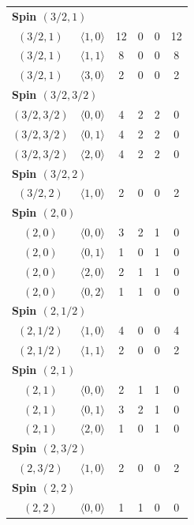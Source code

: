 \begin{longtable}{c c c c c c}
\midrule
\multicolumn{6}{l}{\textbf{Spin $(3/2,1)$}}\\
$(3/2,1)$ & $\langle 1,0\rangle$ & 12 & 0 & 0 & 12 \\
$(3/2,1)$ & $\langle 1,1\rangle$ & 8 & 0 & 0 & 8 \\
$(3/2,1)$ & $\langle 3,0\rangle$ & 2 & 0 & 0 & 2 \\
\midrule
\multicolumn{6}{l}{\textbf{Spin $(3/2,3/2)$}}\\
$(3/2,3/2)$ & $\langle 0,0\rangle$ & 4 & 2 & 2 & 0 \\
$(3/2,3/2)$ & $\langle 0,1\rangle$ & 4 & 2 & 2 & 0 \\
$(3/2,3/2)$ & $\langle 2,0\rangle$ & 4 & 2 & 2 & 0 \\
\midrule
\multicolumn{6}{l}{\textbf{Spin $(3/2,2)$}}\\
$(3/2,2)$ & $\langle 1,0\rangle$ & 2 & 0 & 0 & 2 \\
\midrule
\multicolumn{6}{l}{\textbf{Spin $(2,0)$}}\\
$(2,0)$ & $\langle 0,0\rangle$ & 3 & 2 & 1 & 0 \\
$(2,0)$ & $\langle 0,1\rangle$ & 1 & 0 & 1 & 0 \\
$(2,0)$ & $\langle 2,0\rangle$ & 2 & 1 & 1 & 0 \\
$(2,0)$ & $\langle 0,2\rangle$ & 1 & 1 & 0 & 0 \\
\midrule
\multicolumn{6}{l}{\textbf{Spin $(2,1/2)$}}\\
$(2,1/2)$ & $\langle 1,0\rangle$ & 4 & 0 & 0 & 4 \\
$(2,1/2)$ & $\langle 1,1\rangle$ & 2 & 0 & 0 & 2 \\
\midrule
\multicolumn{6}{l}{\textbf{Spin $(2,1)$}}\\
$(2,1)$ & $\langle 0,0\rangle$ & 2 & 1 & 1 & 0 \\
$(2,1)$ & $\langle 0,1\rangle$ & 3 & 2 & 1 & 0 \\
$(2,1)$ & $\langle 2,0\rangle$ & 1 & 0 & 1 & 0 \\
\midrule
\multicolumn{6}{l}{\textbf{Spin $(2,3/2)$}}\\
$(2,3/2)$ & $\langle 1,0\rangle$ & 2 & 0 & 0 & 2 \\
\midrule
\multicolumn{6}{l}{\textbf{Spin $(2,2)$}}\\
$(2,2)$ & $\langle 0,0\rangle$ & 1 & 1 & 0 & 0 \\
\bottomrule
\end{longtable}
